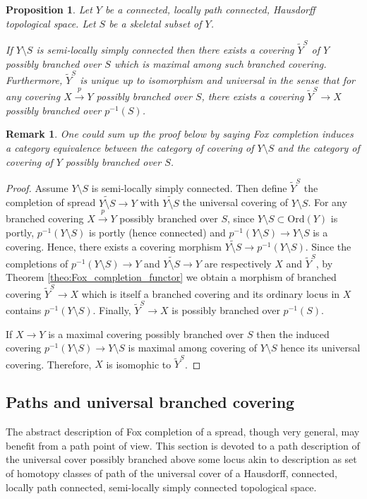 \documentclass[a4paper,12pt]{article}
\newtheorem{prop}[lem]{Proposition}
\newtheorem{rem}{Remark}             %
\def\ord{\mathrm{Ord}}
\begin{document}
\begin{prop}\label{prop:universality} Let $Y$ be a connected, locally path connected, Hausdorff topological space.  Let $S$ be a skeletal subset of $Y$.

If $Y\setminus S$ is semi-locally simply connected then  there exists a covering $\widetilde Y^S$ of $Y$ possibly branched over $S$ which is maximal among such branched covering.
Furthermore, $\widetilde Y^S$
 is unique up to isomorphism and universal in the sense that for any covering $X\xrightarrow{p} Y$ possibly branched over $S$, there exists a covering $\widetilde Y^S\rightarrow X$ possibly branched over $p^{-1}(S)$.
\end{prop}
\begin{rem}\label{rem:one_could_sum_up}
One could sum up the proof below by saying Fox completion induces a category equivalence between the category of covering of $Y\setminus S$  and the category of covering of $Y$ possibly branched over $S$.
\end{rem}
\begin{proof} 


 Assume $Y\setminus S$ is semi-locally simply connected. Then define $\widetilde Y^S$ the completion of spread $\widetilde {Y\setminus S} \rightarrow Y$ with $\widetilde {Y\setminus S}$ the universal covering of $Y\setminus S$. For any branched covering $X\xrightarrow{p}Y$ possibly branched over $S$, since $Y\setminus S\subset \ord(Y)$ is portly, $p^{-1}(Y\setminus S)$ is portly (hence connected) and $p^{-1}(Y\setminus S) \rightarrow Y\setminus S$ is a covering. Hence, there exists a covering morphism $\widetilde {Y\setminus S} \rightarrow p^{-1}(Y\setminus S) $. Since the completions of 
 $p^{-1}(Y\setminus S) \rightarrow Y$ and $\widetilde {Y\setminus S}\rightarrow Y$ are respectively $X$ and $\widetilde Y^S$, by Theorem \ref{theo:Fox_completion_functor} we obtain a morphism of branched covering 
 $\widetilde Y^S \rightarrow X$ which is itself a branched covering and its ordinary locus in $X$ contains $p^{-1}(Y\setminus S)$. Finally, $\widetilde Y^S \rightarrow X$ is possibly branched over $p^{-1}(S)$. 
 
 If $X\rightarrow Y$ is a maximal  covering possibly branched over $S$ then the induced covering $p^{-1}(Y\setminus S)\rightarrow Y\setminus S$  is maximal among covering of $Y\setminus S$ hence its universal covering. Therefore, $X$ is isomophic to $\widetilde Y^S$.
\end{proof}
\subsection{Paths and universal branched covering}
The abstract description of Fox completion of a spread, though very general, may benefit from a path point of view. This section is devoted to a path description of the universal cover possibly branched above some locus akin to  description as set of homotopy classes of path of the universal cover of a Hausdorff, connected, locally path connected, semi-locally simply connected topological space. 
\end{document}
